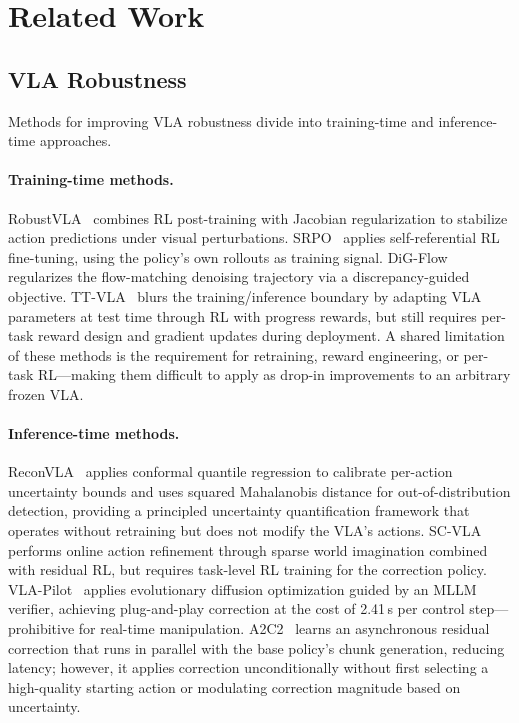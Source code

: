 \section{Related Work}\label{sec:related_work}

\subsection{VLA Robustness}

Methods for improving VLA robustness divide into training-time and inference-time approaches.

\paragraph{Training-time methods.}
RobustVLA~\cite{robustvla2025} combines RL post-training with Jacobian regularization to stabilize action predictions under visual perturbations.
SRPO~\cite{srpo2025} applies self-referential RL fine-tuning, using the policy's own rollouts as training signal.
DiG-Flow~\cite{digflow2025} regularizes the flow-matching denoising trajectory via a discrepancy-guided objective.
TT-VLA~\cite{liu2026ttvla} blurs the training/inference boundary by adapting VLA parameters at test time through RL with progress rewards, but still requires per-task reward design and gradient updates during deployment.
A shared limitation of these methods is the requirement for retraining, reward engineering, or per-task RL---making them difficult to apply as drop-in improvements to an arbitrary frozen VLA.

\paragraph{Inference-time methods.}
ReconVLA~\cite{chen2026reconvla} applies conformal quantile regression to calibrate per-action uncertainty bounds and uses squared Mahalanobis distance for out-of-distribution detection, providing a principled uncertainty quantification framework that operates without retraining but does not modify the VLA's actions.
SC-VLA~\cite{liu2026scvla} performs online action refinement through sparse world imagination combined with residual RL, but requires task-level RL training for the correction policy.
VLA-Pilot~\cite{li2025vlapilot} applies evolutionary diffusion optimization guided by an MLLM verifier, achieving plug-and-play correction at the cost of 2.41\,s per control step---prohibitive for real-time manipulation.
A2C2~\cite{a2c2_2025} learns an asynchronous residual correction that runs in parallel with the base policy's chunk generation, reducing latency; however, it applies correction unconditionally without first selecting a high-quality starting action or modulating correction magnitude based on uncertainty.

